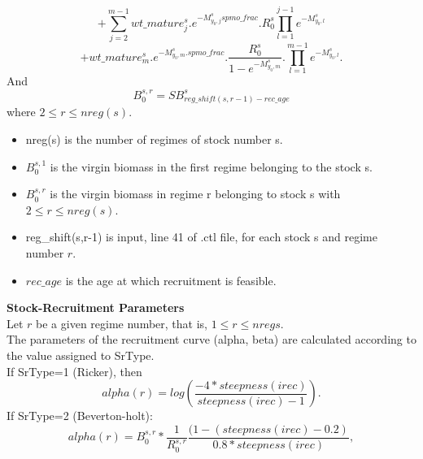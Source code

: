 \documentclass{article}
\begin{document}
\begin{equation*}
    +\sum_{j=2}^{m-1}wt\_mature^s_j.e^{-M^s_{y_0,j} spmo\_frac}.R^s_0\prod_{l=1}^{j-1}e^{-M^s_{y_0,l}} 
\end{equation*}
\begin{equation*}
    + wt\_mature^s_{m}.e^{-M^s_{y_0,m}.spmo\_frac}.\dfrac{R^s_0}{1-e^{-M^s_{y_0,m}}}.\prod_{l=1}^{m-1}e^{-M^s_{y_0,l}}.
\end{equation*}
And
\begin{equation}
    B^{s,r}_0 = SB^s_{reg\_shift(s,r-1)-rec\_age}
\end{equation}
where $2\leq r \leq nreg(s)$.
\begin{itemize}
    \item nreg(s) is the number of regimes of stock number s.
    \item %
    $B^{s,1}_0$ is the virgin biomass in the first regime belonging to the stock s.
    \item  %
    $B^{s,r}_0$ is the virgin biomass in regime r belonging to stock s with $2\leq r \leq nreg(s)$.
    \item reg\_shift(s,r-1) is input, line 41 of .ctl file, for each stock s and regime number $r$.
    \item $rec\_age$ is the age at which recruitment is feasible.
\end{itemize}
\textbf{Stock-Recruitment Parameters}\\
Let $r$ be a given regime number, that is, $1\leq r \leq nregs$.\\
The parameters of the recruitment curve (alpha, beta) are calculated according to the value assigned to SrType.\\
If SrType=1 (Ricker), then
\begin{equation}
alpha(r)=log\left(\dfrac{-4*steepness(irec)}{steepness(irec)-1}\right).
\end{equation}
If SrType=2 (Beverton-holt):
\begin{equation}
    alpha(r) = B^{s,r}_0*\dfrac{1}{R^{s,r}_0}\dfrac{(1-(steepness(irec)-0.2)}{0.8*steepness(irec)},
\end{equation}
\end{document}
